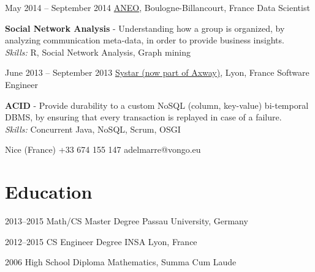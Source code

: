 \documentclass{tccv}
\renewcommand{\it}{\textit}
\renewcommand{\bf}{\textbf}
\begin{document}
\begin{eventlist}
\item{May 2014 -- September 2014}
    {\href{https://www.aneo.eu/}{ANEO}, Boulogne-Billancourt, France}
    {Data Scientist}

\bf{Social Network Analysis} - Understanding how a group is organized, by analyzing communication meta-data, in order to provide business insights.\\
\it{Skills:} R, Social Network Analysis, Graph mining

\item{June 2013 -- September 2013}
    {\href{https://www.axway.com}{Systar (now part of Axway)}, Lyon, France}
    {Software Engineer}

\bf{ACID} - Provide durability to a custom NoSQL (column, key-value) bi-temporal DBMS, by ensuring that every transaction is replayed in case of a failure.\\
\it{Skills:} Concurrent Java, NoSQL, Scrum, OSGI



\end{eventlist}

\personal
    {Nice (France)}
    {+33 674 155 147}
    {adelmarre@vongo.eu}

\section{Education}

\begin{yearlist}

\item{2013--2015}
     {Math/CS Master Degree}
     {Passau University, Germany}

\item{2012--2015}
     {CS Engineer Degree}
     {INSA Lyon, France}

\item{2006}
     {High School Diploma}
     {Mathematics, Summa Cum Laude}

\end{yearlist}
\end{document}
